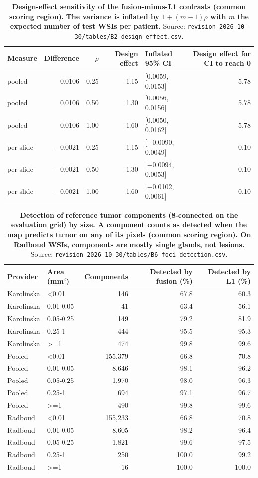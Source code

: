 \documentclass[10pt]{article}
\begin{document}
\begin{table}[H]\centering\footnotesize
\caption{\textbf{Design-effect sensitivity of the fusion-minus-L1 contrasts (common scoring region). The variance is inflated by $1+(m-1)\rho$ with $m$ the expected number of test WSIs per patient.} Source: \texttt{revision\_2026-10-30/tables/B2\_design\_effect.csv}.}
\begin{tabular}{lrrrlr}\toprule
Measure & Difference & $\rho$ & Design effect & Inflated 95\% CI & Design effect for CI to reach 0\\\midrule
pooled & 0.0106 & 0.25 & 1.15 & [0.0059, 0.0153] & 5.78\\
pooled & 0.0106 & 0.50 & 1.30 & [0.0056, 0.0156] & 5.78\\
pooled & 0.0106 & 1.00 & 1.60 & [0.0050, 0.0162] & 5.78\\
per slide & $-$0.0021 & 0.25 & 1.15 & [$-$0.0090, 0.0049] & 0.10\\
per slide & $-$0.0021 & 0.50 & 1.30 & [$-$0.0094, 0.0053] & 0.10\\
per slide & $-$0.0021 & 1.00 & 1.60 & [$-$0.0102, 0.0061] & 0.10\\
\bottomrule\end{tabular}\end{table}

\begin{table}[H]\centering\footnotesize
\caption{\textbf{Detection of reference tumor components (8-connected on the evaluation grid) by size. A component counts as detected when the map predicts tumor on any of its pixels (common scoring region). On Radboud WSIs, components are mostly single glands, not lesions.} Source: \texttt{revision\_2026-10-30/tables/B6\_foci\_detection.csv}.}
\begin{tabular}{llrrr}\toprule
Provider & Area (mm$^2$) & Components & Detected by fusion (\%) & Detected by L1 (\%)\\\midrule
Karolinska & <0.01 & 146 & 67.8 & 60.3\\
Karolinska & 0.01-0.05 & 41 & 63.4 & 56.1\\
Karolinska & 0.05-0.25 & 149 & 79.2 & 81.9\\
Karolinska & 0.25-1 & 444 & 95.5 & 95.3\\
Karolinska & >=1 & 474 & 99.8 & 99.6\\
Pooled & <0.01 & 155,379 & 66.8 & 70.8\\
Pooled & 0.01-0.05 & 8,646 & 98.1 & 96.2\\
Pooled & 0.05-0.25 & 1,970 & 98.0 & 96.3\\
Pooled & 0.25-1 & 694 & 97.1 & 96.7\\
Pooled & >=1 & 490 & 99.8 & 99.6\\
Radboud & <0.01 & 155,233 & 66.8 & 70.8\\
Radboud & 0.01-0.05 & 8,605 & 98.2 & 96.4\\
Radboud & 0.05-0.25 & 1,821 & 99.6 & 97.5\\
Radboud & 0.25-1 & 250 & 100.0 & 99.2\\
Radboud & >=1 & 16 & 100.0 & 100.0\\
\bottomrule\end{tabular}\end{table}
\end{document}

